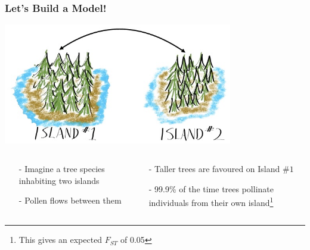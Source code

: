 \documentclass[xcolor=dvipsnames]{beamer}
\begin{document}
\begin{frame}
\frametitle{Let's Build a Model!}
\centering	\includegraphics[keepaspectratio, width  = 0.75\textwidth]{img/treeIslands}
\begin{columns}
	\begin{column}{0.4\textwidth}
	\begin{itemize}
	\item[-] Imagine a tree species inhabiting two islands
	\item[-] Pollen flows between them 


\end{itemize}

		\end{column}
	\begin{column}{0.7\textwidth}
		\begin{itemize}
				\item[-] Taller trees are favoured on Island $\#1$
	\item[-] 99.9\% of the time trees pollinate individuals from their own island\footnote{This gives an expected $F_{ST}$ of 0.05}
			\end{itemize}
	\end{column}
\end{columns}
\vspace{15pt}


\end{frame}
\end{document}
